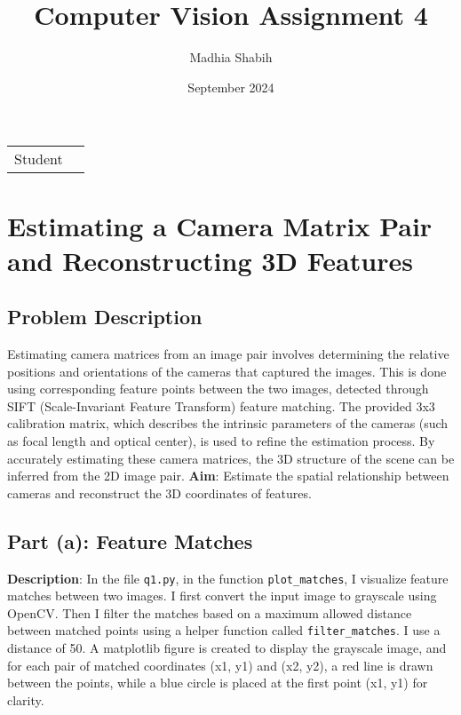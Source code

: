 \documentclass{article}
\title{Computer Vision Assignment 4
}
\author{Madhia Shabih}
\date{September 2024}
\begin{document}
\maketitle

\noindent\begin{tabular}{@{}ll}
    Student & \author\\
     
\end{tabular}

\section{Estimating a Camera Matrix Pair and Reconstructing 3D Features}

\subsection{Problem Description}
Estimating camera matrices from an image pair involves determining the relative positions and orientations of the cameras that captured the images. 
This is done using corresponding feature points between the two images, detected through SIFT (Scale-Invariant Feature Transform) feature matching. 
The provided 3x3 calibration matrix, which describes the intrinsic parameters of the cameras (such as focal length and optical center), is used to refine the estimation process.
By accurately estimating these camera matrices, the 3D structure of the scene can be inferred from the 2D image pair.
\textbf{Aim}: Estimate the spatial relationship between cameras and reconstruct the 3D coordinates of features.

\subsection{Part (a): Feature Matches}
\textbf{Description}: %
In the file \texttt{q1.py}, in the function \texttt{plot\_matches}, I visualize feature matches between two images. 
I first convert the input image to grayscale using OpenCV. Then I filter the matches based on a maximum allowed distance between matched points using a helper function called \texttt{filter\_matches}. 
I use a distance of 50. A matplotlib figure is created to display the grayscale image, and for each pair of matched coordinates (x1, y1) and (x2, y2), 
a red line is drawn between the points, while a blue circle is placed at the first point (x1, y1) for clarity.
\end{document}
